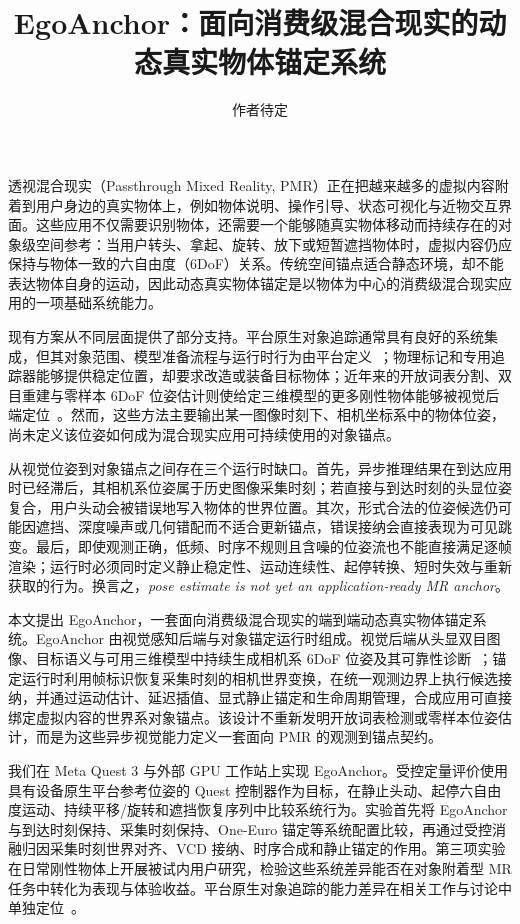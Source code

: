 \documentclass[review]{vgtc}
\title{EgoAnchor：面向消费级混合现实的动态真实物体锚定系统}
\author{作者待定}
\begin{document}
\label{sec:introduction}
\maketitle

透视混合现实（Passthrough Mixed Reality, PMR）正在把越来越多的虚拟内容附着到用户身边的真实物体上，例如物体说明、操作引导、状态可视化与近物交互界面。这些应用不仅需要识别物体，还需要一个能够随真实物体移动而持续存在的对象级空间参考：当用户转头、拿起、旋转、放下或短暂遮挡物体时，虚拟内容仍应保持与物体一致的六自由度（6DoF）关系。传统空间锚点适合静态环境，却不能表达物体自身的运动，因此动态真实物体锚定是以物体为中心的消费级混合现实应用的一项基础系统能力。

现有方案从不同层面提供了部分支持。平台原生对象追踪通常具有良好的系统集成，但其对象范围、模型准备流程与运行时行为由平台定义~\cite{appleObjectAnchor,azureObjectAnchors,vuforiaModelTargets,metaDynamicObjectTracker}；物理标记和专用追踪器能够提供稳定位置，却要求改造或装备目标物体；近年来的开放词表分割、双目重建与零样本 6DoF 位姿估计则使给定三维模型的更多刚性物体能够被视觉后端定位~\cite{posecnn2017,densefusion2019,cosypose2020,megapose2022,foundationpose2023}。然而，这些方法主要输出某一图像时刻下、相机坐标系中的物体位姿，尚未定义该位姿如何成为混合现实应用可持续使用的对象锚点。

从视觉位姿到对象锚点之间存在三个运行时缺口。首先，异步推理结果在到达应用时已经滞后，其相机系位姿属于历史图像采集时刻；若直接与到达时刻的头显位姿复合，用户头动会被错误地写入物体的世界位置。其次，形式合法的位姿候选仍可能因遮挡、深度噪声或几何错配而不适合更新锚点，错误接纳会直接表现为可见跳变。最后，即使观测正确，低频、时序不规则且含噪的位姿流也不能直接满足逐帧渲染；运行时必须同时定义静止稳定性、运动连续性、起停转换、短时失效与重新获取的行为。换言之，\emph{pose estimate is not yet an application-ready MR anchor}。

本文提出 EgoAnchor，一套面向消费级混合现实的端到端动态真实物体锚定系统。EgoAnchor 由视觉感知后端与对象锚定运行时组成。视觉后端从头显双目图像、目标语义与可用三维模型中持续生成相机系 6DoF 位姿及其可靠性诊断~\cite{yoloe2025,cutie2024,foundationstereo2025,foundationpose2023}；锚定运行时利用帧标识恢复采集时刻的相机世界变换，在统一观测边界上执行候选接纳，并通过运动估计、延迟插值、显式静止锚定和生命周期管理，合成应用可直接绑定虚拟内容的世界系对象锚点。该设计不重新发明开放词表检测或零样本位姿估计，而是为这些异步视觉能力定义一套面向 PMR 的观测到锚点契约。

我们在 Meta Quest 3 与外部 GPU 工作站上实现 EgoAnchor。受控定量评价使用具有设备原生平台参考位姿的 Quest 控制器作为目标，在静止头动、起停六自由度运动、持续平移/旋转和遮挡恢复序列中比较系统行为。实验首先将 EgoAnchor 与到达时刻保持、采集时刻保持、One-Euro 锚定等系统配置比较，再通过受控消融归因采集时刻世界对齐、VCD 接纳、时序合成和静止锚定的作用。第三项实验在日常刚性物体上开展被试内用户研究，检验这些系统差异能否在对象附着型 MR 任务中转化为表现与体验收益。平台原生对象追踪的能力差异在相关工作与讨论中单独定位~\cite{appleObjectAnchor,azureObjectAnchors,metaDynamicObjectTracker}。
\end{document}
